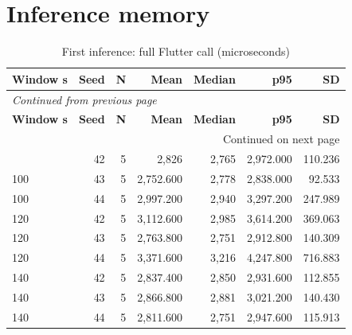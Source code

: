 \documentclass[10pt,a4paper]{article}
\begin{document}
\section{Inference memory}
\begingroup\small\setlength{\tabcolsep}{4pt}\renewcommand{\arraystretch}{1.12}
\begin{longtable}{@{}lrrrrrr@{}}
\caption{First inference:\allowbreak{} full Flutter call (microseconds)}\\
\toprule
\textbf{Window s} & \textbf{Seed} & \textbf{N} & \textbf{Mean} & \textbf{Median} & \textbf{p95} & \textbf{SD} \\
\midrule\endfirsthead
\multicolumn{7}{l}{\small\itshape Continued from previous page}\\
\toprule
\textbf{Window s} & \textbf{Seed} & \textbf{N} & \textbf{Mean} & \textbf{Median} & \textbf{p95} & \textbf{SD} \\
\midrule\endhead
\midrule\multicolumn{7}{r}{\small Continued on next page}\\\endfoot
\bottomrule\endlastfoot
100 & 42 & 5 & 2,826 & 2,765 & 2,972.000 & 110.236 \\
100 & 43 & 5 & 2,752.600 & 2,778 & 2,838.000 & 92.533 \\
100 & 44 & 5 & 2,997.200 & 2,940 & 3,297.200 & 247.989 \\
120 & 42 & 5 & 3,112.600 & 2,985 & 3,614.200 & 369.063 \\
120 & 43 & 5 & 2,763.800 & 2,751 & 2,912.800 & 140.309 \\
120 & 44 & 5 & 3,371.600 & 3,216 & 4,247.800 & 716.883 \\
140 & 42 & 5 & 2,837.400 & 2,850 & 2,931.600 & 112.855 \\
140 & 43 & 5 & 2,866.800 & 2,881 & 3,021.200 & 140.430 \\
140 & 44 & 5 & 2,811.600 & 2,751 & 2,947.600 & 115.913 \\
\end{longtable}\endgroup
\begingroup\small\setlength{\tabcolsep}{4pt}\renewcommand{\arraystretch}{1.12}
\end{document}
